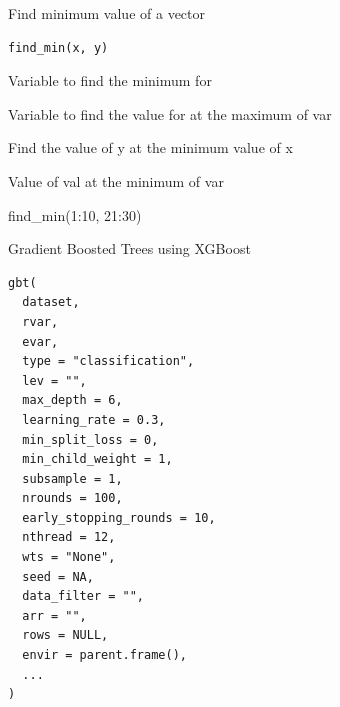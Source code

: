 \documentclass[a4paper]{book}
\begin{document}
%
\begin{Description}
Find minimum value of a vector
\end{Description}
%
\begin{Usage}
\begin{verbatim}
find_min(x, y)
\end{verbatim}
\end{Usage}
%
\begin{Arguments}
\begin{ldescription}
\item[\code{x}] Variable to find the minimum for

\item[\code{y}] Variable to find the value for at the maximum of var
\end{ldescription}
\end{Arguments}
%
\begin{Details}
Find the value of y at the minimum value of x
\end{Details}
%
\begin{Value}
Value of val at the minimum of var
\end{Value}
%
\begin{Examples}
\begin{ExampleCode}
find_min(1:10, 21:30)

\end{ExampleCode}
\end{Examples}
%
\begin{Description}
Gradient Boosted Trees using XGBoost
\end{Description}
%
\begin{Usage}
\begin{verbatim}
gbt(
  dataset,
  rvar,
  evar,
  type = "classification",
  lev = "",
  max_depth = 6,
  learning_rate = 0.3,
  min_split_loss = 0,
  min_child_weight = 1,
  subsample = 1,
  nrounds = 100,
  early_stopping_rounds = 10,
  nthread = 12,
  wts = "None",
  seed = NA,
  data_filter = "",
  arr = "",
  rows = NULL,
  envir = parent.frame(),
  ...
)
\end{verbatim}
\end{Usage}
%
\end{document}
